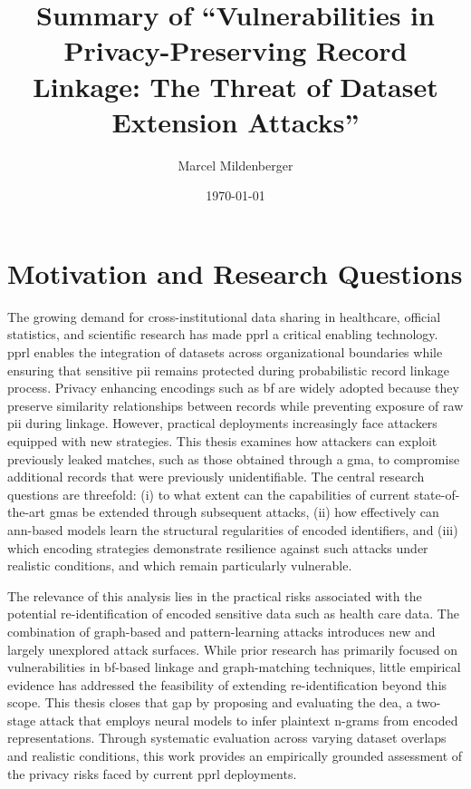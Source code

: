 \documentclass[a4paper,11pt]{scrartcl}
\title{Summary of ``Vulnerabilities in Privacy-Preserving Record Linkage: The Threat of Dataset Extension Attacks''}
\author{Marcel Mildenberger}
\date{\today}
\begin{document}
\maketitle

\section{Motivation and Research Questions}
The growing demand for cross-institutional data sharing in healthcare, official statistics, and scientific research has made \ac{pprl} a critical enabling technology. 
\ac{pprl} enables the integration of datasets across organizational boundaries while ensuring that sensitive \ac{pii} remains protected during probabilistic record linkage process. 
Privacy enhancing encodings such as \ac{bf} are widely adopted because they preserve similarity relationships between records while preventing exposure of raw \ac{pii} during linkage. 
However, practical deployments increasingly face attackers equipped with new strategies. 
This thesis examines how attackers can exploit previously leaked matches, such as those obtained through a \ac{gma}, to compromise additional records that were previously unidentifiable. 
The central research questions are threefold: 
(i) to what extent can the capabilities of current state-of-the-art \ac{gma}s be extended through subsequent attacks, 
(ii) how effectively can \ac{ann}-based models learn the structural regularities of encoded identifiers, 
and (iii) which encoding strategies demonstrate resilience against such attacks under realistic conditions, and which remain particularly vulnerable.

The relevance of this analysis lies in the practical risks associated with the potential re-identification of encoded sensitive data such as health care data.
The combination of graph-based and pattern-learning attacks introduces new and largely unexplored attack surfaces. 
While prior research has primarily focused on vulnerabilities in \ac{bf}-based linkage and graph-matching techniques, little empirical evidence has addressed the feasibility of extending re-identification beyond this scope. 
This thesis closes that gap by proposing and evaluating the \ac{dea}, a two-stage attack that employs neural models to infer plaintext n-grams from encoded representations. 
Through systematic evaluation across varying dataset overlaps and realistic conditions, this work provides an empirically grounded assessment of the privacy risks faced by current \ac{pprl} deployments.
\end{document}

